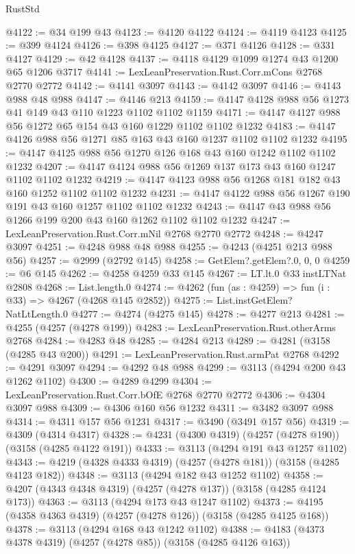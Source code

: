 \begin{lexlean}{RustStd}
\begin{coremodule}
{\begin{coremodule}
{{{{{{{{{{{{{{{{{{{{{{{{{{@4122 := @34 @199 @43
@4123 := @4120 @4122
@4124 := @4119 @4123
@4125 := @399 @4124
@4126 := @398 @4125
@4127 := @371 @4126
@4128 := @331 @4127
@4129 := @42 @4128
@4137 := @4118 @4129 @1099 @1274 @43 @1200 @65 @1206 @3717
@4141 := LexLeanPreservation.Rust.Corr.mCons @2768 @2770 @2772
@4142 := @4141 @3097
@4143 := @4142 @3097
@4146 := @4143 @988 @48 @988
@4147 := @4146 @213
@4159 := @4147 @4128 @988 @56 @1273 @41 @149 @43 @110 @1223 @1102 @1102 @1159
@4171 := @4147 @4127 @988 @56 @1272 @65 @154 @43 @160 @1229 @1102 @1102 @1232
@4183 := @4147 @4126 @988 @56 @1271 @85 @163 @43 @160 @1237 @1102 @1102 @1232
@4195 := @4147 @4125 @988 @56 @1270 @126 @168 @43 @160 @1242 @1102 @1102 @1232
@4207 := @4147 @4124 @988 @56 @1269 @137 @173 @43 @160 @1247 @1102 @1102 @1232
@4219 := @4147 @4123 @988 @56 @1268 @181 @182 @43 @160 @1252 @1102 @1102 @1232
@4231 := @4147 @4122 @988 @56 @1267 @190 @191 @43 @160 @1257 @1102 @1102 @1232
@4243 := @4147 @43 @988 @56 @1266 @199 @200 @43 @160 @1262 @1102 @1102 @1232
@4247 := LexLeanPreservation.Rust.Corr.mNil @2768 @2770 @2772
@4248 := @4247 @3097
@4251 := @4248 @988 @48 @988
@4255 := @4243 (@4251 @213 @988 @56)
@4257 := @2999 (@2792 @145)
@4258 := GetElem?.getElem?.{0, 0, 0}
@4259 := @6 @145
@4262 := @4258 @4259 @33 @145
@4267 := LT.lt.{0} @33 instLTNat @2808
@4268 := List.length.{0}
@4274 := @4262 (fun (as : @4259) => fun (i : @33) => @4267 (@4268 @145 @2852))
@4275 := List.instGetElem?NatLtLength.{0}
@4277 := @4274 (@4275 @145)
@4278 := @4277 @213
@4281 := @4255 (@4257 (@4278 @199))
@4283 := LexLeanPreservation.Rust.otherArms @2768
@4284 := @4283 @48
@4285 := @4284 @213
@4289 := @4281 (@3158 (@4285 @43 @200))
@4291 := LexLeanPreservation.Rust.armPat @2768
@4292 := @4291 @3097
@4294 := @4292 @48 @988
@4299 := @3113 (@4294 @200 @43 @1262 @1102)
@4300 := @4289 @4299
@4304 := LexLeanPreservation.Rust.Corr.bOfE @2768 @2770 @2772
@4306 := @4304 @3097 @988
@4309 := @4306 @160 @56 @1232
@4311 := @3482 @3097 @988
@4314 := @4311 @157 @56 @1231
@4317 := @3490 (@3491 @157 @56)
@4319 := @4309 (@4314 @4317)
@4328 := @4231 (@4300 @4319) (@4257 (@4278 @190)) (@3158 (@4285 @4122 @191))
@4333 := @3113 (@4294 @191 @43 @1257 @1102)
@4343 := @4219 (@4328 @4333 @4319) (@4257 (@4278 @181)) (@3158 (@4285 @4123 @182))
@4348 := @3113 (@4294 @182 @43 @1252 @1102)
@4358 := @4207 (@4343 @4348 @4319) (@4257 (@4278 @137)) (@3158 (@4285 @4124 @173))
@4363 := @3113 (@4294 @173 @43 @1247 @1102)
@4373 := @4195 (@4358 @4363 @4319) (@4257 (@4278 @126)) (@3158 (@4285 @4125 @168))
@4378 := @3113 (@4294 @168 @43 @1242 @1102)
@4388 := @4183 (@4373 @4378 @4319) (@4257 (@4278 @85)) (@3158 (@4285 @4126 @163))
}}}}}}}}}}}}}}}}}}}}}}}}}}
\end{coremodule}}
\end{coremodule}
\end{lexlean}
